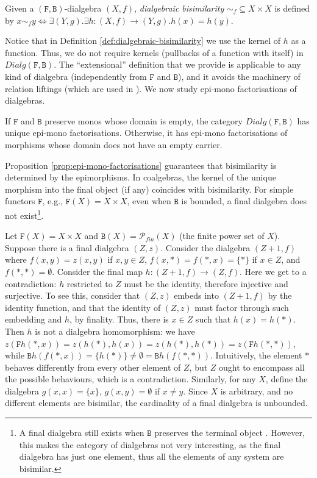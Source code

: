 \documentclass[orivec]{llncs}
\newcommand{\mF}[1]{\mathtt{#1}}
\newcommand{\F}{\mF{F}}
\newcommand{\B}{\mF{B}}
\newcommand{\dialg}{\mathit{Dialg}}
\newcommand{\Pow}{\mathcal{P}}
\newcommand{\defend}{}
\renewenvironment{definition}{\begin{defn}}{\defend\end{defn}}
\begin{document}
\begin{definition}\label{def:dialgebraic-bisimilarity}
	Given a $(\F,\B)$-dialgebra $(X,f)$, \emph{dialgebraic bisimilarity} $\sim_f \subseteq X \times X$ is defined by $x \sim_f y \iff \exists (Y,g) . \exists h : (X,f) \to (Y,g) . h(x) = h(y)$. 
\end{definition}
\medskip

Notice that in Definition \ref{def:dialgebraic-bisimilarity} we use the kernel of $h$ as a function. Thus, we do not require kernels (pullbacks of a function with itself) in $\dialg(\F,\B)$. The ``extensional'' definition that we provide is applicable to any kind of dialgebra (independently from $\F$ and $\B$), and it avoids the machinery of relation liftings (which are used in \cite{PZ01}). We now study epi-mono factorisations of dialgebras. 

\begin{proposition}\label{prop:epi-mono-factorisations}
	If $\F$ and $\B$ preserve monos whose domain is empty, the category $\dialg(\F,\B)$ has unique epi-mono factorisations. Otherwise, it has epi-mono factorisations of morphisms whose domain does not have an empty carrier.
\end{proposition}

Proposition \ref{prop:epi-mono-factorisations} guarantees that bisimilarity is determined by the  epimorphisms.  
In coalgebras, the kernel of the unique morphism into the final object (if any) coincides with bisimilarity. For simple functors $\F$, e.g., $\F(X) = X\times X$, even when $\B$ is bounded, a final dialgebra does not exist\footnote{A final dialgebra still exists when $\B$ preserves the terminal object \cite{Vou10}. However, this makes the category of dialgebras not very interesting, as the final dialgebra has just one element, thus all the elements of any system are bisimilar.}.

\begin{example}\label{exa:lack-of-final-dialgebra}
Let $\F(X) = X \times X$ and $\B(X) = \Pow_{fin}(X)$ (the finite power set of $X$). Suppose there is a final dialgebra $(Z,z)$. Consider the dialgebra $(Z+1,f)$ where $f(x,y) = z(x,y)$ if $x,y \in Z$, $f(x,*) = f(*,x) = \{ * \}$ if $x \in Z$, and $f(*,*) = \emptyset$. Consider the final map $h : (Z+1,f) \to (Z,f)$. Here we get to a contradiction: $h$ restricted to $Z$ must be the identity, therefore injective and surjective. To see this, consider that $(Z,z)$ embeds into $(Z+1,f)$ by the identity function, and that the identity of $(Z,z)$ must factor through such embedding and $h$, by finality. Thus, there is $x \in Z$ such that $h(x) = h(*)$. Then $h$ is not a dialgebra homomorphism: we have $z(\F h(*,x)) = z(h(*),h(x)) = z(h(*),h(*)) = z(\F h(*,*))$, while $\B h (f(*,x)) = \{ h(*) \} \neq \emptyset = \B h(f(*,*))$.
Intuitively, the element $*$ behaves differently from every other element of $Z$, but $Z$ ought to encompass all the possible behaviours, which is a contradiction.
Similarly, for any $X$, define the dialgebra $g(x,x) = \{x\}$, $g(x,y) = \emptyset$ if $x \neq y$. Since $X$ is arbitrary, and no different elements are bisimilar, the cardinality of a final dialgebra is unbounded.
\end{example}
\end{document}
